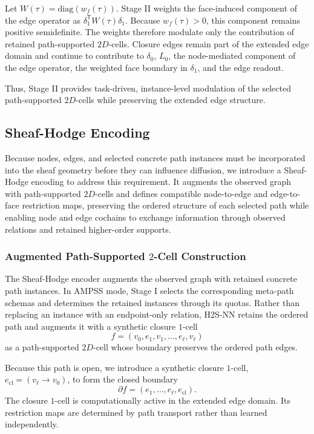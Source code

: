 \documentclass[sigconf,anonymous,review]{acmart}
\newcommand{\method}{\textsc{H2S-NN}}
\newcommand{\ampss}{\textsc{AMPSS}}
\newcommand{\transpose}{\mathsf{T}}
\begin{document}
Let \(W(\tau)=\mathrm{diag}(w_f(\tau))\). Stage II weights the
face-induced component of the edge operator as
\(\delta_1^{\transpose}W(\tau)\delta_1\). Because \(w_f(\tau)>0\), this
component remains positive semidefinite. The weights therefore modulate only
the contribution of retained path-supported \(2D\)-cells. Closure edges remain
part of the extended edge domain and continue to contribute to
\(\delta_0\), \(L_0\), the node-mediated component of the edge operator, the
weighted face boundary in \(\delta_1\), and the edge readout.

Thus, Stage II provides task-driven, instance-level modulation of the selected path-supported \(2D\)-cells while preserving the extended edge structure.

\subsection{Sheaf-Hodge Encoding}

Because nodes, edges, and selected concrete path instances must be incorporated into the sheaf geometry before they can influence diffusion, we introduce a Sheaf-Hodge encoding to address this requirement. It augments the observed graph with path-supported \(2D\)-cells and defines compatible node-to-edge and edge-to-face restriction maps, preserving the ordered structure of each selected path while enabling node and edge cochains to exchange information through observed relations and retained higher-order supports.

\subsubsection{Augmented Path-Supported \(2\)-Cell Construction}

The Sheaf-Hodge encoder augments the observed graph with retained concrete
path instances. In \ampss{} mode, Stage I selects the corresponding
meta-path schemas and determines the retained instances through its
quotas. Rather than replacing an instance with an endpoint-only relation,
\method{} retains the ordered path and augments it with a synthetic closure \(1\)-cell
\[
  f=(v_0,e_1,v_1,\ldots,e_\ell,v_\ell)
\]
as a path-supported \(2D\)-cell whose boundary preserves the ordered path
edges.

Because this path is open, we introduce a synthetic closure \(1\)-cell,
\(e_{\mathrm{cl}}=(v_\ell\rightarrow v_0)\), to form the closed boundary
\begin{equation}
  \partial f=(e_1,\ldots,e_\ell,e_{\mathrm{cl}}).
  \label{eq:face-boundary}
\end{equation}
The closure \(1\)-cell is computationally active in the extended edge domain. Its restriction maps are determined by path transport rather than learned independently.
\end{document}
